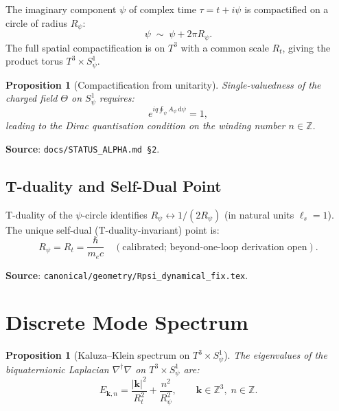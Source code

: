 \documentclass[11pt,a4paper]{article}
\newtheorem{proposition}[theorem]{Proposition}
\theoremstyle{definition}
\theoremstyle{remark}
\begin{document}
The imaginary component $\psi$ of complex time $\tau = t + i\psi$ is compactified
on a circle of radius $R_\psi$:
\begin{equation}\label{eq:psi_circle}
  \psi \;\sim\; \psi + 2\pi R_\psi.
\end{equation}
The full spatial compactification is on $T^3$ with a common scale $R_t$,
giving the product torus $T^3 \times S^1_\psi$.

\begin{proposition}[Compactification from unitarity]\label{prop:compact}
Single-valuedness of the charged field $\Theta$ on $S^1_\psi$ requires:
\begin{equation}\label{eq:quantisation}
  e^{i q \oint_\psi A_\psi\,\mathrm{d}\psi} = 1,
\end{equation}
leading to the Dirac quantisation condition on the winding number $n \in \mathbb{Z}$.
\end{proposition}

\noindent\textbf{Source}: \texttt{docs/STATUS\_ALPHA.md \S2}.

\subsection{T-duality and Self-Dual Point}

T-duality of the $\psi$-circle identifies $R_\psi \leftrightarrow 1/(2R_\psi)$
(in natural units $\ell_s = 1$).  The unique self-dual (T-duality-invariant)
point is:
\begin{equation}\label{eq:selfdual}
  R_\psi = R_t = \frac{\hbar}{m_e c}
  \quad (\text{calibrated; beyond-one-loop derivation open}).
\end{equation}

\noindent\textbf{Source}: \texttt{canonical/geometry/Rpsi\_dynamical\_fix.tex}.

\section{Discrete Mode Spectrum}\label{sec:modes}

\begin{proposition}[Kaluza--Klein spectrum on $T^3 \times S^1_\psi$]
\label{prop:KK}
The eigenvalues of the biquaternionic Laplacian $\nabla^\dagger\nabla$ on
$T^3 \times S^1_\psi$ are:
\begin{equation}\label{eq:KK_spectrum}
  E_{\mathbf{k},n}
  = \frac{|\mathbf{k}|^2}{R_t^2} + \frac{n^2}{R_\psi^2},
  \qquad \mathbf{k} \in \mathbb{Z}^3,\; n \in \mathbb{Z}.
\end{equation}
\end{proposition}
\end{document}
